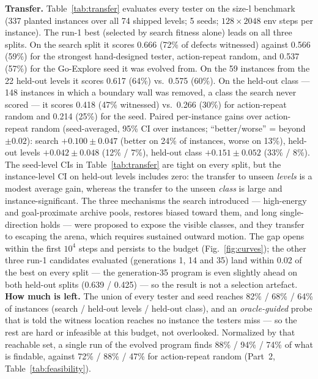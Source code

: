 \textbf{Transfer.} Table~\ref{tab:transfer} evaluates every tester on the size-l benchmark (337 planted instances over all 74 shipped
levels; 5 seeds; $128\times2048$ env steps per instance). The run-1 best (selected by search fitness alone) leads on all three splits.
On the search split it scores 0.666 (72\% of defects witnessed) against 0.566 (59\%) for the strongest hand-designed tester,
action-repeat random, and 0.537 (57\%) for the Go-Explore seed it was evolved from. On the 59 instances from the 22 held-out levels
it scores 0.617 (64\%) vs.\ 0.575 (60\%). On the held-out class --- 148 instances in which a boundary wall was removed, a class the
search never scored --- it scores 0.418 (47\% witnessed) vs.\ 0.266 (30\%) for action-repeat random and 0.214 (25\%) for the seed.
Paired per-instance gains over action-repeat random (seed-averaged, 95\% CI over instances; ``better/worse'' = beyond $\pm0.02$):
search $+0.100\pm0.047$ (better on 24\% of instances, worse on 13\%), held-out levels $+0.042\pm0.048$ (12\% / 7\%), held-out class
$+0.151\pm0.052$ (33\% / 8\%). The seed-level CIs in Table~\ref{tab:transfer} are tight on every split, but the instance-level CI on
held-out levels includes zero: the transfer to unseen \emph{levels} is a modest average gain, whereas the transfer to the unseen
\emph{class} is large and instance-significant. The three mechanisms the search introduced --- high-energy and goal-proximate archive
pools, restores biased toward them, and long single-direction holds --- were proposed to expose the visible classes, and they transfer
to escaping the arena, which requires sustained outward motion. The gap opens within the first $10^4$ steps and persists to the budget
(Fig.~\ref{fig:curves}); the other three run-1 candidates evaluated (generations 1, 14 and 35) land within 0.02 of the best on every split --- the
generation-35 program is even slightly ahead on both held-out splits (0.639 / 0.425) --- so the result is not a selection artefact. \textbf{How much is left.} The union of every tester and seed reaches 82\% / 68\% / 64\% of
instances (search / held-out levels / held-out class), and an \emph{oracle-guided} probe that is told the witness location reaches
no instance the testers miss --- so the rest are hard or infeasible at this budget, not overlooked. Normalized by that reachable set,
a single run of the evolved program finds 88\% / 94\% / 74\% of what is findable, against 72\% / 88\% / 47\% for action-repeat random
(Part~2, Table~\ref{tab:feasibility}).

